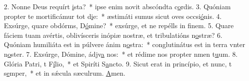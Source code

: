2. Nonne Deus requírt \uline{i}sta?~* ipse enim novit abscóndta c\uline{o}rdis.
3. Quóniam propter te mortificámur tot d\uline{i}e:~* æstimáti sumus sicut oves occsi\uline{ó}nis.
4. Exsúrge, quare obdórms, D\uline{ó}mine?~* exsúrge, et ne repélls in f\uline{i}nem.
5. Quare fáciem tuam avértis, oblivísceris inópiæ nostræ, et tribulatións n\uline{o}stræ?
6. Quóniam humiliáta est in púlvere ánim n\uline{o}stra:~* conglutinátus est in terra vnter n\uline{o}ster.
7. Exsúrge, Dómine, ádjv\uline{a} nos:~* et rédime nos propter nmen t\uline{u}um.
8. Glória Patri, t F\uline{í}lio,~* et Spiríti S\uline{a}ncto.
9. Sicut erat in princípio, et nunc, t s\uline{e}mper,~* et in sǽcula sæculrum. \uline{A}men.
